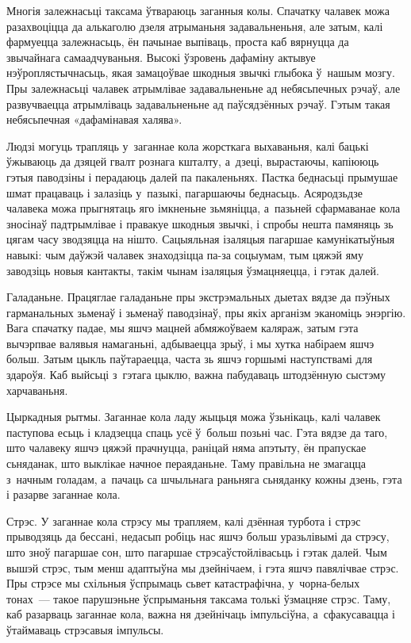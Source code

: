 Многія залежнасьці таксама ўтвараюць заганныя колы. Спачатку чалавек можа разахвоціцца да алькаголю дзеля атрыманьня задавальненьня, але затым, калі фармуецца залежнасьць, ён пачынае выпіваць, проста каб вярнуцца да звычайнага самаадчуваньня. Высокі ўзровень дафаміну актывуе нэўроплястычнасьць, якая замацоўвае шкодныя звычкі глыбока ў~нашым мозгу. Пры залежнасьці чалавек атрымлівае задавальненьне ад небясьпечных рэчаў, але развучваецца атрымліваць задавальненьне ад паўсядзённых рэчаў. Гэтым такая небясьпечная «дафамінавая халява».

Людзі могуць трапляць у~заганнае кола жорсткага выхаваньня, калі бацькі ўжываюць да дзяцей гвалт рознага кшталту, а~дзеці, вырастаючы, капіююць гэтыя паводзіны і перадаюць далей па пакаленьнях. Пастка беднасьці прымушае шмат працаваць і залазіць у~пазыкі, пагаршаючы беднасьць. Асяродзьдзе чалавека можа прыгнятаць яго імкненьне зьмяніцца, а~пазьней сфармаванае кола зносінаў падтрымлівае і правакуе шкодныя звычкі, і спробы нешта памяняць зь цягам часу зводзяцца на нішто. Сацыяльная ізаляцыя пагаршае камунікатыўныя навыкі: чым даўжэй чалавек знаходзіцца па-за соцыумам, тым цяжэй яму заводзіць новыя кантакты, такім чынам ізаляцыя ўзмацняецца, і гэтак далей.

Галаданьне. Працяглае галаданьне пры экстрэмальных дыетах вядзе да пэўных гарманальных зьменаў і зьменаў паводзінаў, пры якіх арганізм эканоміць энэргію. Вага спачатку падае, мы яшчэ мацней абмяжоўваем каляраж, затым гэта вычэрпвае валявыя намаганьні, адбываецца зрыў, і мы хутка набіраем яшчэ больш. Затым цыкль паўтараецца, часта зь яшчэ горшымі наступствамі для здароўя. Каб выйсьці з~гэтага цыклю, важна пабудаваць штодзённую сыстэму харчаваньня.

Цыркадныя рытмы. Заганнае кола ладу жыцьця можа ўзьнікаць, калі чалавек паступова есьць і кладзецца спаць усё ў~больш позьні час. Гэта вядзе да таго, што чалавеку яшчэ цяжэй прачнуцца, раніцай няма апэтыту, ён прапускае сьняданак, што выклікае начное пераяданьне. Таму правільна не змагацца з~начным голадам, а~пачаць са шчыльнага раньняга сьняданку кожны дзень, гэта і разарве заганнае кола.

Стрэс. У заганнае кола стрэсу мы трапляем, калі дзённая турбота і стрэс прыводзяць да бессані, недасып робіць нас яшчэ больш уразьлівымі да стрэсу, што зноў пагаршае сон, што пагаршае стрэсаўстойлівасьць і гэтак далей. Чым вышэй стрэс, тым менш адаптыўна мы дзейнічаем, і гэта яшчэ павялічвае стрэс. Пры стрэсе мы схільныя ўспрымаць сьвет катастрафічна, у~чорна-белых тонах~--- такое парушэньне ўспрыманьня таксама толькі ўзмацняе стрэс. Таму, каб разарваць заганнае кола, важна ня дзейнічаць імпульсіўна, а~сфакусавацца і ўтаймаваць стрэсавыя імпульсы.

